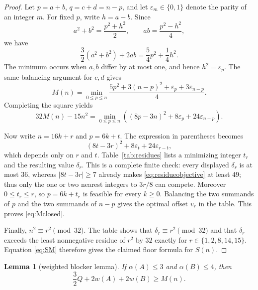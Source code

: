 \documentclass[11pt]{article}
\theoremstyle{plain}
\newtheorem{lemma}[theorem]{Lemma}
\theoremstyle{definition}
\theoremstyle{remark}
\newcommand{\1}{\mathbf 1}
\begin{document}
\begin{proof}
Let $p=a+b$, $q=c+d=n-p$, and let $\varepsilon_m\in\{0,1\}$ denote the
parity of an integer $m$.  For fixed $p$, write $h=a-b$.  Since
\[
 a^2+b^2=\frac{p^2+h^2}{2},\qquad
 ab=\frac{p^2-h^2}{4},
\]
we have
\[
 \frac32(a^2+b^2)+2ab=\frac54p^2+\frac14h^2.
\]
The minimum occurs when $a,b$ differ by at most one, and hence $h^2=
\varepsilon_p$.  The same balancing argument for $c,d$ gives
\begin{equation}\label{eq:Monevar}
 M(n)=\min_{0\leq p\leq n}
 \frac{5p^2+3(n-p)^2+\varepsilon_p+3\varepsilon_{n-p}}4.
\end{equation}
Completing the square yields
\begin{equation}\label{eq:Mcorrection}
 32M(n)-15n^2=
 \min_{0\leq p\leq n}
 \left((8p-3n)^2+8\varepsilon_p+24\varepsilon_{n-p}\right).
\end{equation}

Now write $n=16k+r$ and $p=6k+t$.  The expression in parentheses becomes
\begin{equation}\label{eq:residueobjective}
 (8t-3r)^2+8\varepsilon_t+24\varepsilon_{r-t},
\end{equation}
which depends only on $r$ and $t$.  Table~\ref{tab:residues} lists a
minimizing integer $t_r$ and the resulting value $\delta_r$.  This is a
complete finite check: every displayed $\delta_r$ is at most $36$, whereas
$|8t-3r|\geq7$ already makes \eqref{eq:residueobjective} at least $49$; thus
only the one or two nearest integers to $3r/8$ can compete.  Moreover
$0\leq t_r\leq r$, so $p=6k+t_r$ is feasible for every $k\geq0$.  Balancing
the two summands of $p$ and the two summands of $n-p$ gives the optimal
offset $v_r$ in the table.  This proves \eqref{eq:Mclosed}.

Finally, $n^2\equiv r^2\pmod{32}$.  The table shows that
$\delta_r\equiv r^2\pmod{32}$ and that $\delta_r$ exceeds the least
nonnegative residue of $r^2$ by $32$ exactly for
$r\in\{1,2,8,14,15\}$.  Equation \eqref{eq:SM} therefore gives the claimed
floor formula for $S(n)$.
\end{proof}

\begin{lemma}[weighted blocker lemma]\label{lem:blocker}
If $\alpha(A)\leq3$ and $\alpha(B)\leq4$, then
\begin{equation}\label{eq:blocker}
 \frac32Q+2w(A)+2w(B)\geq M(n).
\end{equation}
\end{lemma}
\end{document}
